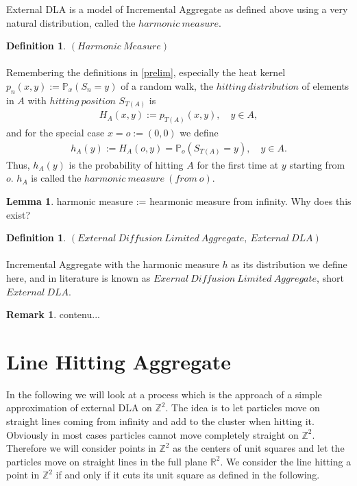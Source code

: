 \documentclass[12pt,a4paper]{scrartcl}
\numberwithin{equation}{section}
\numberwithin{equation}{section}%
\theoremstyle{definition}
\newtheorem{lemma}[theorem]{Lemma}
\newtheorem{definition}[theorem]{Definition}
\theoremstyle{definition}
\newtheorem{rem}[thm]{Remark}%
\begin{document}
External DLA is a model of Incremental Aggregate as defined above using a very natural distribution, called the $\mathit{harmonic\ measure}$. 

\begin{definition} $\mathit{(Harmonic\ Measure)}$\\
	\\
	Remembering the definitions in \eqref{prelim}, especially the heat kernel $p_n(x,y):=\mathbb{P}_x(S_n=y)$ of a random walk, the $\mathit{hitting\ distribution}$ of elements in $A$ with $\mathit{hitting\ position}$ $S_{T(A)}$ is 
	\begin{align*}
	H_A(x,y) := p_{T(A)}(x,y),\quad y\in A, 
	\end{align*}
	and for the special case $x=o:=(0,0)$ we define
	\begin{align*}
	h_A(y) := H_A(o,y) = \mathbb{P}_o(S_{T(A)}=y),\quad y\in A.
	\end{align*}
	Thus, $h_A(y)$ is the probability of hitting $A$ for the first time at $y$ starting from $o$. $h_A$ is called the $\mathit{harmonic\ measure\ (from\ o)}$.
\end{definition}

\begin{lemma}
	harmonic measure := hearmonic measure from infinity. Why does this exist?
\end{lemma}

\begin{definition} $\mathit{(External\ Diffusion\ Limited\ Aggregate,\ External\ DLA)}$\\
	\\ Incremental Aggregate with the harmonic measure $h$ as its distribution we define here, and in literature is known as $\mathit{Exernal\ Diffusion\ Limited\ Aggregate}$, short $\mathit{External\ DLA}$.
\end{definition}

\begin{rem}
	contenu...
\end{rem}


\newpage


\section{Line Hitting Aggregate}

In the following we will look at a process which is the approach of a simple approximation of external DLA on $\mathbb{Z}^2$. The idea is to let particles move on straight lines coming from infinity and add to the cluster when hitting it. Obviously in most cases particles cannot move completely straight on $\mathbb{Z}^2$. Therefore we will consider points in $\mathbb{Z}^2$ as the centers of unit squares and let the particles move on straight lines in the full plane $\mathbb{R}^2$. We consider the line hitting a point in $\mathbb{Z}^2$ if and only if it cuts its unit square as defined in the following. 
\end{document}
